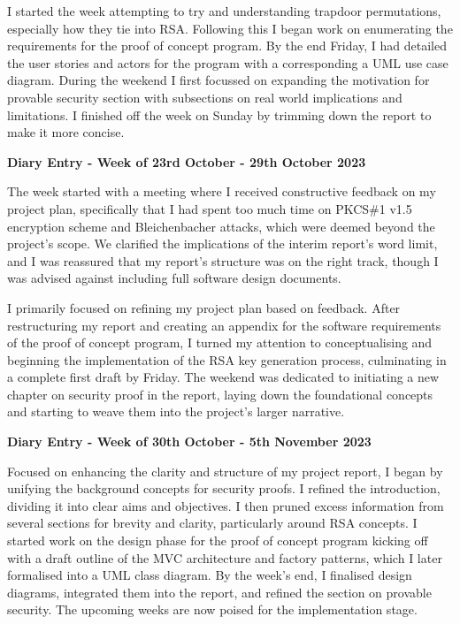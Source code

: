 \documentclass[]{final_report}
\theoremstyle{definition}
\begin{document}
I started the week attempting to try and understanding trapdoor permutations, especially how they
tie into RSA. Following this I began work on enumerating the requirements for the proof of concept
program. By the end Friday, I had detailed the user stories and actors for the program with a
corresponding a UML use case diagram. During the weekend I first focussed on expanding the
motivation for provable security section with subsections on real world implications and
limitations. I finished off the week on Sunday by trimming down the report to make it more concise.

\textbf{Diary Entry - Week of 23rd October - 29th October 2023}

The week started with a meeting where I received constructive feedback on my project plan,
specifically that I had spent too much time on PKCS\#1 v1.5 encryption scheme and Bleichenbacher
attacks, which were deemed beyond the project’s scope. We clarified the implications of the interim
report's word limit, and I was reassured that my report’s structure was on the right track, though I
was advised against including full software design documents.

I primarily focused on refining my project plan based on feedback. After restructuring my report and
creating an appendix for the software requirements of the proof of concept program, I turned my
attention to conceptualising and beginning the implementation of the RSA key generation process,
culminating in a complete first draft by Friday. The weekend was dedicated to initiating a new
chapter on security proof in the report, laying down the foundational concepts and starting to weave
them into the project's larger narrative.

\textbf{Diary Entry - Week of 30th October - 5th November 2023}

Focused on enhancing the clarity and structure of my project report, I began by unifying the
background concepts for security proofs. I refined the introduction, dividing it into clear aims and
objectives. I then pruned excess information from several sections for brevity and clarity,
particularly around RSA concepts. I started work on the design phase for the proof of concept
program kicking off with a draft outline of the MVC architecture and factory patterns, which I later
formalised into a UML class diagram. By the week's end, I finalised design diagrams, integrated them
into the report, and refined the section on provable security. The upcoming weeks are now poised for
the implementation stage.
\end{document}
